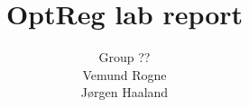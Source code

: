 \documentclass{article}
\title{OptReg lab report}
\author{Group ??\\Vemund Rogne\\Jørgen Haaland}
\begin{document}


\newpage
\setcounter{page}{1}



\clearpage



\clearpage



\clearpage


\begin{figure}
    \begin{center}
        
    \end{center}
\end{figure}

\clearpage

\begin{figure}
    \begin{center}
        
    \end{center}
\end{figure}


\newpage
{}


\label{sec:bibliography}
\end{document}

